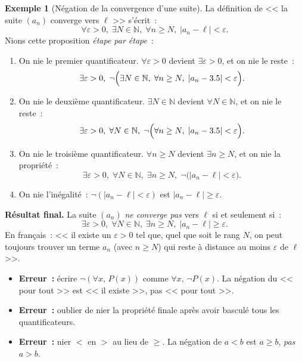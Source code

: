 \documentclass[12pt,a4paper,openany]{book}
\theoremstyle{definition}
\newtheorem{exemple}{Exemple}[chapter]
\newcommand{\N}{\mathbb{N}}
\newcommand{\eps}{\varepsilon}
\newcommand{\abs}[1]{\left\lvert #1 \right\rvert}
\begin{document}
\begin{exemple}[Négation de la convergence d'une suite]\label{ex:neg-convergence}
  La définition de << la suite $(a_n)$ converge vers $\ell$ >> s'écrit~:
  \[
    \forall \eps > 0,\; \exists N \in \N,\; \forall n \geq N,\; \abs{a_n - \ell} < \eps.
  \]
  Nions cette proposition \emph{étape par étape}~:
  \begin{enumerate}[label=\textbf{Étape \arabic*} :]
    \item On nie le premier quantificateur. $\forall \eps > 0$ devient $\exists \eps > 0$, et on nie le reste~:
    \[
      \exists \eps > 0,\; \lnot\Bigl(\exists N \in \N,\; \forall n \geq N,\; \abs{a_n - \ell} < \eps\Bigr).
    \]
    \item On nie le deuxième quantificateur. $\exists N \in \N$ devient $\forall N \in \N$, et on nie le reste~:
    \[
      \exists \eps > 0,\; \forall N \in \N,\; \lnot\Bigl(\forall n \geq N,\; \abs{a_n - \ell} < \eps\Bigr).
    \]
    \item On nie le troisième quantificateur. $\forall n \geq N$ devient $\exists n \geq N$, et on nie la propriété~:
    \[
      \exists \eps > 0,\; \forall N \in \N,\; \exists n \geq N,\; \lnot\bigl(\abs{a_n - \ell} < \eps\bigr).
    \]
    \item On nie l'inégalité~: $\lnot(\abs{a_n - \ell} < \eps)$ est $\abs{a_n - \ell} \geq \eps$.
  \end{enumerate}

  \medskip
  \textbf{Résultat final.} La suite $(a_n)$ \emph{ne converge pas} vers $\ell$ si et seulement si~:
  \[
    \boxed{\exists \eps > 0,\; \forall N \in \N,\; \exists n \geq N,\; \abs{a_n - \ell} \geq \eps.}
  \]
  En français~: << il existe un $\eps > 0$ tel que, quel que soit le rang $N$, on peut toujours trouver un terme $a_n$ (avec $n \geq N$) qui reste à distance au moins $\eps$ de $\ell$ >>.
\end{exemple}

\begin{errmark}
  \begin{itemize}
    \item \textbf{Erreur~:} écrire $\lnot(\forall x,\, P(x))$ comme $\forall x,\, \lnot P(x)$. La négation du << pour tout >> est << il existe >>, pas << pour tout >>.
    \item \textbf{Erreur~:} oublier de nier la propriété finale après avoir basculé tous les quantificateurs.
    \item \textbf{Erreur~:} nier $<$ en $>$ au lieu de $\geq$. La négation de $a < b$ est $a \geq b$, \emph{pas} $a > b$.
  \end{itemize}
\end{errmark}
\end{document}
